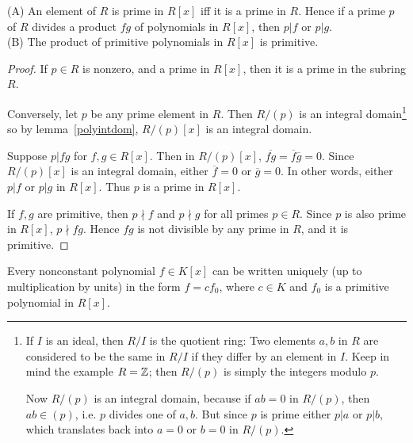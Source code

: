 \begin{lem}\label{gausslemma}
(A) An element of $R$ is prime in $R[x]$ iff it is a prime in $R$. Hence if a prime $p$ of $R$ divides a product $fg$ of polynomials in $R[x]$, then $p|f$ or $p|g$.\\
(B) The product of primitive polynomials in $R[x]$ is primitive.
\end{lem}
\begin{proof}
If $p\in R$ is nonzero, 
and a prime in $R[x]$, then it is a prime in the subring $R$.

Conversely, let $p$ be any prime element in $R$. 
Then $R/(p)$
 is an integral domain\footnote{
If $I$ is an ideal, then $R/I$ is the quotient ring: Two elements $a,b$ in $R$ are considered to be the same in $R/I$ if they differ by an element in $I$. Keep in mind the example $R=\mathbb{Z}$; then $R/(p)$ is simply the integers modulo $p$.

Now $R/(p)$ is an integral domain, because if $ab=0$ in $R/(p)$, then $ab\in (p)$, i.e. $p$ divides one of $a,b$. But since $p$ is prime either $p|a$ or $p|b$, which translates back into $a=0$ or $b=0$ in $R/(p)$. 
} so by lemma~\ref{polyintdom}, $R/(p)[x]$ is an integral domain.

Suppose $p|fg$ for $f,g\in R[x]$. 
Then in $R/(p)[x]$, $\overline{fg}=\overline{f}\overline{g}=0$. 
Since $R/(p)[x]$ is an integral domain, either $\overline{f}=0$ or $\overline{g}=0$. 
In other words, either $p|f$ or $p|g$ in $R[x]$. Thus $p$ is a prime in $R[x]$.

If $f,g$ are primitive, then $p\nmid  f$ and $p\nmid g$ for all primes $p\in R$. Since $p$ is also prime in $R[x]$, $p\nmid fg$. Hence $fg$ is not divisible by any prime in $R$, and it is primitive.
\end{proof}
\begin{lem}\label{consttimesprimitive}
Every nonconstant polynomial $f\in K[x]$ can be written uniquely (up to multiplication by units) in the form $f=cf_0$, where $c\in K$ and $f_0$ is a primitive polynomial in $R[x]$.
\end{lem}

